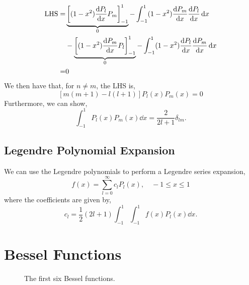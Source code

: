 \documentclass{book}
\begin{document}
\begin{equation}
	\begin{split}
		\text{LHS} = & \underbrace{\left[(1-x^2)\dv{P_l}{x}P_m\right]_{-1}^{1}}_0 - \int_{-1}^{1} (1-x^2) \dv{P_m}{x}  \dv{P_l}{x}\dd{x} \\
		& - \underbrace{\left[(1-x^2)\dv{P_m}{x}P_l\right]_{-1}^{1}}_0 - \int_{-1}^{1}(1-x^2)\dv{P_l}{x} \dv{P_m}{x}\dd{x} \\
		= & 0
	\end{split}
\end{equation}
We then have that, for $n\neq m$, the LHS is,
\begin{equation}
	\left[m(m+1)-l(l+1)\right]P_{l}(x)P_m(x) = 0
\end{equation}
Furthermore, we can show,
\begin{equation}
	\boxed{\int_{-1}^1 P_l(x)P_m(x) \dd{x} = \frac{2}{2l + 1}\delta_{lm}}.
\end{equation}
\subsection{Legendre Polynomial Expansion}
We can use the Legendre polynomials to perform a Legendre series expansion,
\begin{equation}
	f(x) = \sum_{l=0}^{\infty}c_lP_l(x), \hspace{1em} -1 \leq x \leq 1
\end{equation}
where the coefficients are given by,
\begin{equation}
	c_l = \frac{1}{2}(2l + 1)\int_{-1}^{1}\int_{-1}^{1}f(x)P_l(x)\dd{x}.
\end{equation}
\section{Bessel Functions}


\begin{figure}
	\centering
{}
\caption{The first six Bessel functions.} %
\end{figure}
\end{document}
